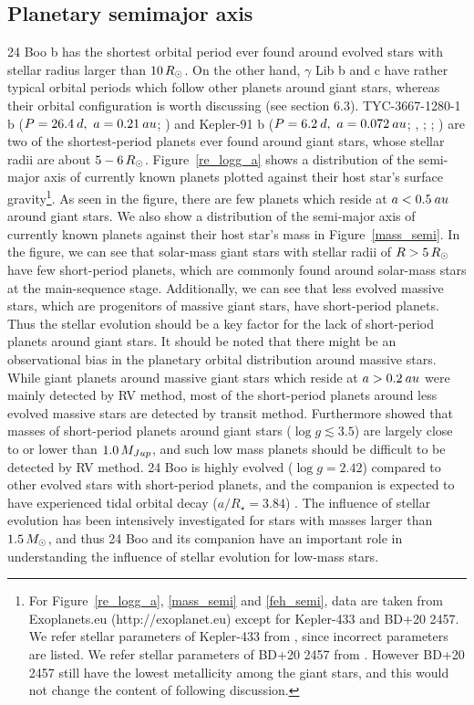 \documentclass[]{pasj01}
\begin{document}
\subsection{Planetary semimajor axis}
\label{sub:Planetsemi}
24 Boo b has the shortest orbital period ever found around evolved stars with stellar radius larger than $10\,R_{\solar}$. 
On the other hand, $\gamma$ Lib b and c have rather typical orbital periods which follow other planets around giant stars, whereas their orbital configuration is worth discussing (see section 6.3).
TYC-3667-1280-1 b ($P=26.4\>{\rm d},\ a=0.21\>{\rm au}$; \cite{Niedzielski2016}) and Kepler-91 b ($P=6.2\>{\rm d},\ a=0.072\>{\rm au}$; \cite{Lillo-Box2014a}, ; \cite{Barclay2015}; \cite{Sato2015}) are two of the shortest-period planets ever found around giant stars, whose stellar radii are about $5-6\,R_{\solar}$.
Figure~\ref{re_logg_a} shows a distribution of the semi-major axis of currently known planets plotted against their host star's surface gravity\footnote{
For Figure~\ref{re_logg_a}, \ref{mass_semi} and \ref{feh_semi}, data are taken from Exoplanets.eu (http://exoplanet.eu) except for Kepler-433 and BD+20 2457. 
We refer stellar parameters of Kepler-433 from \citet{Almenara2015}, since incorrect parameters are listed. 
We refer stellar parameters of BD+20 2457 from \citet{Mortier2013}. 
However BD+20 2457 still have the lowest metallicity among the giant stars, and this would not change the content of following discussion.}. 
As seen in the figure, there are few planets which reside at $a<0.5\>{\rm au}$ around giant stars.
We also show a distribution of the semi-major axis of currently known planets against their host star's mass in Figure~\ref{mass_semi}. 
In the figure, we can see that solar-mass giant stars with stellar radii of $R>5\,R_{\solar}$ have few short-period planets, which are commonly found around solar-mass stars at the main-sequence stage.
Additionally, we can see that less evolved massive stars, which are progenitors of massive giant stars, have short-period planets.
Thus the stellar evolution should be a key factor for the lack of short-period planets around giant stars.
It should be noted that there might be an observational bias in the planetary orbital distribution around massive stars.
While giant planets around massive giant stars which reside at $a>0.2\>{\rm au}$ were mainly detected by RV method, most of the short-period planets around less evolved massive stars are detected by transit method.
Furthermore \citet{Jones2017arXiv} showed that masses of short-period planets around giant stars ($\log g\lesssim3.5$) are largely close to or lower than $1.0\,M_{\rm Jup}$, and such low mass planets should be difficult to be detected by RV method.
24 Boo is highly evolved ($\log g=2.42$) compared to other evolved stars with short-period planets, and the companion is expected to have experienced tidal orbital decay ($a/R_\star=3.84$) \citep{Villaver2014}.
The influence of stellar evolution has been intensively investigated for stars with masses larger than $1.5\,M_{\solar}$, and thus 24 Boo and its companion have an important role in understanding the influence of stellar evolution for low-mass stars.
\end{document}
